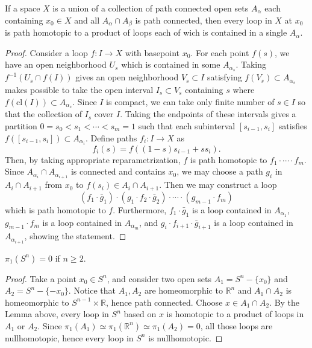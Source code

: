 \begin{lemma} If a space $X$ is a union of a collection of path connected open sets $A_\alpha$ each containing $x_0\in X$ and all $A_\alpha\cap A_\beta$ is path connected, then every loop in $X$ at $x_0$ is path homotopic to a product of loops each of wich is contained in a single $A_\alpha$.
\end{lemma}
\begin{proof}
Consider a loop $f:I\rightarrow X$ with basepoint $x_0$. For each point $f(s)$, we have an open neighborhood $U_s$ which is contained in some $A_{\alpha_s}$. Taking $f^{-1}(U_s\cap f(I))$ gives an open neighborhood $V_s\subset I$ satisfying $f(V_s)\subset A_{\alpha_s}$ makes possible to take the open interval $I_s\subset V_s$ containing $s$ where $f(\textrm{cl}(I))\subset A_{\alpha_s}$. Since $I$ is compact, we can take only finite number of $s\in I$ so that the collection of $I_s$ cover $I$. Taking the endpoints of these intervals gives a partition $0=s_0<s_1<\cdots<s_m=1$ such that each subinterval $[s_{i-1},s_i]$ satisfies $f([s_{i-1},s_i])\subset A_{\alpha_i}$. Define paths $f_i:I\rightarrow X$ as
\begin{equation}
f_i(s)=f((1-s)s_{i-1}+ss_{i}).
\end{equation}
Then, by taking appropriate reparametrization, $f$ is path homotopic to $f_1\cdot\cdots\cdot f_m$. Since $A_{\alpha_i}\cap A_{\alpha_{i+1}}$ is connected and contains $x_0$, we may choose a path $g_i$ in $A_i\cap A_{i+1}$ from $x_0$ to $f(s_i)\in A_i\cap A_{i+1}$. Then we may construct a loop
\begin{equation}
(f_1\cdot \bar{g}_1)\cdot (g_1\cdot f_2\cdot \bar{g}_2)\cdot \cdots \cdot (g_{m-1}\cdot f_m)
\end{equation}
which is path homotopic to $f$. Furthermore, $f_1\cdot \bar{g}_1$ is a loop contained in $A_{\alpha_1}$, $g_{m-1}\cdot f_m$ is a loop contained in $A_{\alpha_m}$, and $g_i\cdot f_{i+1}\cdot \bar{g}_{i+1}$ is a loop contained in $A_{\alpha_{i+1}}$, showing the statement.
\end{proof}

\begin{prop} $\pi_1(S^n)=0$ if $n\geq 2$.
\end{prop}
\begin{proof}
Take a point $x_0\in S^n$, and consider two open sets $A_1=S^n-\{x_0\}$ and $A_2=S^n-\{-x_0\}$. Notice that $A_1,A_2$ are homeomorphic to $\mathbb{R}^n$ and $A_1\cap A_2$ is homeomorphic to $S^{n-1}\times \mathbb{R}$, hence path connected. Choose $x\in A_1\cap A_2$. By the Lemma above, every loop in $S^n$ based on $x$ is homotopic to a product of loops in $A_1$ or $A_2$. Since $\pi_1(A_1)\simeq \pi_1(\mathbb{R}^n)\simeq \pi_1(A_2)=0$, all those loops are nullhomotopic, hence every loop in $S^n$ is nullhomotopic.
\end{proof}

